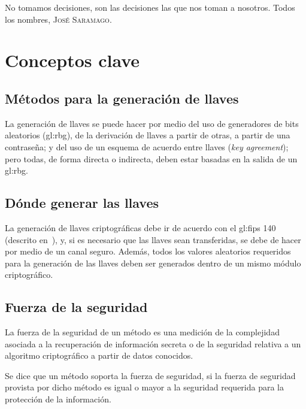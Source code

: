 %
%

{
  \epigrafe
  {%
    No tomamos decisiones, son las decisiones las que nos toman a nosotros.%
  }
  {%
    Todos los nombres,
    \textsc{José Saramago}.%
  }
}


\section{Conceptos clave}

\subsection{Métodos para la generación de llaves}
La generación de llaves se puede hacer por medio del uso de generadores de
bits aleatorios (\gls{gl:rbg}), de la derivación de llaves a partir de otras,
a partir de una contraseña; y del uso de un esquema de acuerdo entre llaves
(\textit{key agreement}); pero todas, de forma directa o indirecta, deben estar
basadas en la salida de un \gls{gl:rbg}.

\subsection{Dónde generar las llaves}
La generación de llaves criptográficas debe ir de acuerdo con el \gls{gl:fips}
140 (descrito en~\cite{nist_modulos_criptograficos}), y, si es necesario que
las llaves sean transferidas, se debe de hacer por medio de un canal seguro.
Además, todos los valores aleatorios requeridos para la generación de las
llaves deben ser generados dentro de un mismo módulo criptográfico.

\subsection{Fuerza de la seguridad}
La fuerza de la seguridad de un método es una medición de la complejidad
asociada a la recuperación de información secreta o de la seguridad relativa
a un algoritmo criptográfico a partir de datos conocidos.

Se dice que un método soporta la fuerza de seguridad, si la fuerza de
seguridad provista por dicho método es igual o mayor a la seguridad
requerida para la protección de la información.

